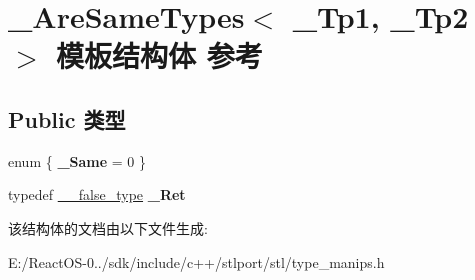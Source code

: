 \hypertarget{struct___are_same_types}{}\section{\+\_\+\+Are\+Same\+Types$<$ \+\_\+\+Tp1, \+\_\+\+Tp2 $>$ 模板结构体 参考}
\label{struct___are_same_types}
\subsection*{Public 类型}
\begin{DoxyCompactItemize}
\item 
\mbox{\label{struct___are_same_types_a761f2dee6d590a43e9e4da8d007d198e}} 
enum \{ {\bfseries \+\_\+\+Same} = 0
 \}
\item 
\mbox{\label{struct___are_same_types_adbd05a065d9dee13e450f1e44e0ffdd3}} 
typedef \hyperlink{struct____false__type}{\+\_\+\+\_\+false\+\_\+type} {\bfseries \+\_\+\+Ret}
\end{DoxyCompactItemize}


该结构体的文档由以下文件生成\+:\begin{DoxyCompactItemize}
\item 
E\+:/\+React\+O\+S-\/0../sdk/include/c++/stlport/stl/type\+\_\+manips.\+h\end{DoxyCompactItemize}
